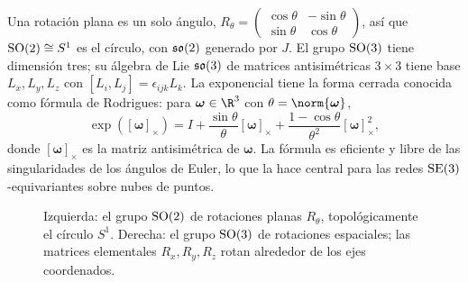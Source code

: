 \begin{example}[$\SO(2)$ y $\SO(3)$]
\label{ex:found:so2-so3}
Una rotaci\'on plana es un solo \'angulo,
$R_\theta = \left(\begin{smallmatrix}\cos\theta & -\sin\theta\\ \sin\theta &
\cos\theta\end{smallmatrix}\right)$, as\'i que $\operatorname{SO}(2) \cong S^1$ es el c\'irculo,
con $\mathfrak{so}(2)$ generado por $J$. El grupo $\SO(3)$ tiene dimensi\'on tres; su
\'algebra de Lie $\mathfrak{so}(3)$ de matrices antisim\'etricas $3\times 3$ tiene base
$L_x, L_y, L_z$ con $[L_i, L_j] = \epsilon_{ijk} L_k$. La exponencial tiene la
forma cerrada conocida como f\'ormula de Rodrigues: para $\boldsymbol{\omega} \in
\R^3$ con $\theta = \norm{\boldsymbol{\omega}}$,
\[
  \exp([\boldsymbol{\omega}]_\times) = I + \frac{\sin\theta}{\theta}
  [\boldsymbol{\omega}]_\times + \frac{1-\cos\theta}{\theta^2}
  [\boldsymbol{\omega}]_\times^2,
\]
donde $[\boldsymbol{\omega}]_\times$ es la matriz antisim\'etrica de
$\boldsymbol{\omega}$. La f\'ormula es eficiente y libre de las singularidades de
los \'angulos de Euler, lo que la hace central para las redes
$\operatorname{SE}(3)$-equivariantes sobre nubes de puntos.
\end{example}

\begin{figure}[h]
\centering
{}
\caption[Rotaciones en el plano y en el espacio]{Izquierda: el grupo $\SO(2)$ de
rotaciones planas $R_\theta$, topol\'ogicamente el c\'irculo $S^1$. Derecha: el
grupo $\SO(3)$ de rotaciones espaciales; las matrices elementales $R_x, R_y, R_z$
rotan alrededor de los ejes coordenados.}
\label{fig:found:rotations}
\end{figure}

